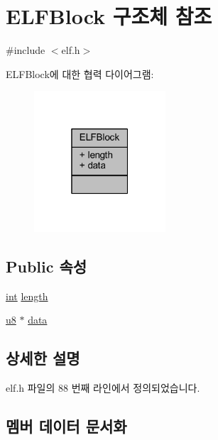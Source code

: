 \hypertarget{struct_e_l_f_block}{}\section{E\+L\+F\+Block 구조체 참조}
\label{struct_e_l_f_block}


{\ttfamily \#include $<$elf.\+h$>$}



E\+L\+F\+Block에 대한 협력 다이어그램\+:\nopagebreak
\begin{figure}[H]
\begin{center}
\leavevmode
\includegraphics[width=139pt]{struct_e_l_f_block__coll__graph}
\end{center}
\end{figure}
\subsection*{Public 속성}
\begin{DoxyCompactItemize}
\item 
\mbox{\hyperlink{_util_8cpp_a0ef32aa8672df19503a49fab2d0c8071}{int}} \mbox{\hyperlink{struct_e_l_f_block_ae79f929b79d2f694695b0633a55078de}{length}}
\item 
\mbox{\hyperlink{_system_8h_aed742c436da53c1080638ce6ef7d13de}{u8}} $\ast$ \mbox{\hyperlink{struct_e_l_f_block_a04ec3cb9c21f5e2b3f720733cb892d21}{data}}
\end{DoxyCompactItemize}


\subsection{상세한 설명}


elf.\+h 파일의 88 번째 라인에서 정의되었습니다.



\subsection{멤버 데이터 문서화}
\mbox{\label{struct_e_l_f_block_a04ec3cb9c21f5e2b3f720733cb892d21}} 
